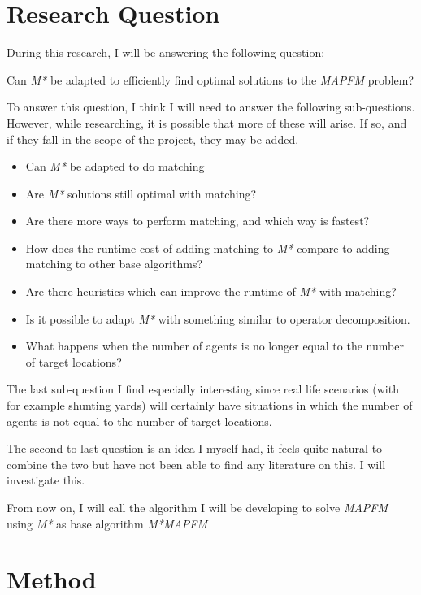 \documentclass[english]{article}
\begin{document}
\section*{Research Question}

During this research, I will be answering the following question:

\begin{displayquote}
    Can \textit{M*} be adapted to efficiently find optimal solutions to the \textit{MAPFM} problem?
\end{displayquote}

To answer this question, I think I will need to answer the following sub-questions. However, while researching, it is possible that more of these will arise. If so, and if they fall in the scope of the project, they may be added.

\begin{itemize}
    \item Can \textit{M*} be adapted to do matching
    \item Are \textit{M*} solutions still optimal with matching?
    \item Are there more ways to perform matching, and which way is fastest?
    \item How does the runtime cost of adding matching to \textit{M*} compare to adding matching to other base algorithms?
    \item Are there heuristics which can improve the runtime of \textit{M*} with matching?
    \item Is it possible to adapt \textit{M*} with something similar to operator decomposition.
    \item What happens when the number of agents is no longer equal to the number of target locations?
\end{itemize}

The last sub-question I find especially interesting since real life scenarios (with for example shunting yards) will certainly have situations in which the number of agents is not equal to the number of target locations.

The second to last question is an idea I myself had, it feels quite natural to combine the two but have not been able to find any literature on this. I will investigate this.

From now on, I will call the algorithm I will be developing to solve \textit{MAPFM} using \textit{M*} as base algorithm \textit{M*MAPFM}

\section{Method}
\end{document}
